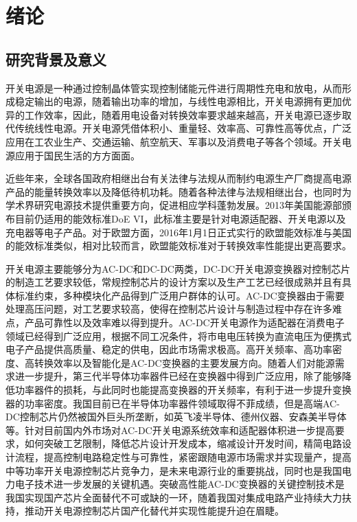 \chapter{绪论}

\section{研究背景及意义}

开关电源是一种通过控制晶体管实现控制储能元件进行周期性充电和放电，从而形成稳定输出的电源，随着输出功率的增加，与线性电源相比，开关电源拥有更加优异的工作效率，因此，随着用电设备对转换效率要求越来越高，开关电源已逐步取代传统线性电源。开关电源凭借体积小、重量轻、效率高、可靠性高等优点，广泛应用在工农业生产、交通运输、航空航天、军事以及消费电子等各个领域。开关电源应用于国民生活的方方面面。

近些年来，全球各国政府相继出台有关法律与法规从而制约电源生产厂商提高电源产品的能量转换效率以及降低待机功耗。随着各种法律与法规相继出台，也同时为学术界研究电源技术提供重要方向，促进相应学科蓬勃发展。2013年美国能源部颁布目前仍适用的能效标准DoE VI，此标准主要是针对电源适配器、开关电源以及充电器等电子产品。对于欧盟方面，2016年1月1日正式实行的欧盟能效标准与美国的能效标准类似，相对比较而言，欧盟能效标准对于转换效率性能提出更高要求。

开关电源主要能够分为AC-DC和DC-DC两类，DC-DC开关电源变换器对控制芯片的制造工艺要求较低，常规控制芯片的设计方案以及生产工艺已经很成熟并且有具体标准约束，多种模块化产品得到广泛用户群体的认可。AC-DC变换器由于需要处理高压问题，对工艺要求较高，使得在控制芯片设计与制造过程中存在许多难点，产品可靠性以及效率难以得到提升。AC-DC开关电源作为适配器在消费电子领域已经得到广泛应用，根据不同工况条件，将市电电压转换为直流电压为便携式电子产品提供高质量、稳定的供电，因此市场需求极高。高开关频率、高功率密度、高转换效率以及智能化是AC-DC变换器的主要发展方向。随着人们对能源需求进一步提升，第三代半导体功率器件已经在变换器中得到广泛应用，除了能够降低功率器件的损耗，与此同时也能提高变换器的开关频率，有利于进一步提升变换器的功率密度。我国目前已在半导体功率器件领域取得不菲成绩，但是高端AC-DC控制芯片仍然被国外巨头所垄断，如英飞凌半导体、德州仪器、安森美半导体等。针对目前国内外市场对AC-DC开关电源系统效率和适配器体积进一步提高要求，如何突破工艺限制，降低芯片设计开发成本，缩减设计开发时间，精简电路设计流程，提高控制电路稳定性与可靠性，紧密跟随电源市场需求并实现量产，提高中等功率开关电源控制芯片竞争力，是未来电源行业的重要挑战，同时也是我国电力电子技术进一步发展的关键机遇。突破高性能AC-DC变换器的关键控制技术是我国实现国产芯片全面替代不可或缺的一环，随着我国对集成电路产业持续大力扶持，推动开关电源控制芯片国产化替代并实现性能提升迫在眉睫。

